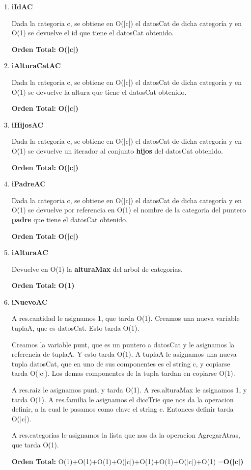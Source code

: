 \begin{enumerate}
\item\textbf{iIdAC}
\par Dada la categoria c, se obtiene en O(|c|) el datosCat de dicha categoría y en O(1) se devuelve el id que tiene el datosCat obtenido.
\par \textbf{Orden Total:} \textbf{O(|c|)}

\item\textbf{iAlturaCatAC}
\par Dada la categoria c, se obtiene en O(|c|) el datosCat de dicha categoría y en O(1) se devuelve la altura que tiene el datosCat obtenido.
\par \textbf{Orden Total:} \textbf{O(|c|)}

\item\textbf{iHijosAC}
\par Dada la categoria c, se obtiene en O(|c|) el datosCat de dicha categoría y en O(1) se devuelve un iterador al conjunto \textbf{hijos} del datosCat obtenido.
\par \textbf{Orden Total:} \textbf{O(|c|)}

\item\textbf{iPadreAC}
\par Dada la categoria c, se obtiene en O(|c|) el datosCat de dicha categoría y en O(1) se devuelve por referencia en O(1) el nombre de la categoria del puntero \textbf{padre} que tiene el datosCat obtenido.
\par \textbf{Orden Total:} \textbf{O(|c|)}

\item\textbf{iAlturaAC}
\par Devuelve en O(1) la \textbf{alturaMax} del arbol de categorias.
\par \textbf{Orden Total:} \textbf{O(1)}

\item\textbf{iNuevoAC}
\par A res.cantidad le asignamos 1, que tarda O(1). Creamos una nueva variable tuplaA, que es datosCat. Esto tarda O(1).
\par Creamos la variable punt, que es un puntero a datosCat y le asignamos la referencia de tuplaA. Y esto tarda O(1). A tuplaA le asignamos una nueva tupla datosCat, que en uno de sus componentes es el string c, y copiarse tarda O(|c|). Los demas componentes de la tupla tardan en copiarse O(1).
\par A res.raiz le asignamos punt, y tarda O(1). A res.alturaMax le asignamos 1, y tarda O(1). A res.familia le asignamos el diccTrie que nos da la operacion definir, a la cual le pasamos como clave el string c. Entonces definir tarda O(|c|).
\par A res.categorias le asignamos la lista que nos da la operacion AgregarAtras, que tarda O(1).
\par \textbf{Orden Total:} O(1)+O(1)+O(1)+O(|c|)+O(1)+O(1)+O(|c|)+O(1) =\textbf{O(|c|)}


\end{enumerate}

